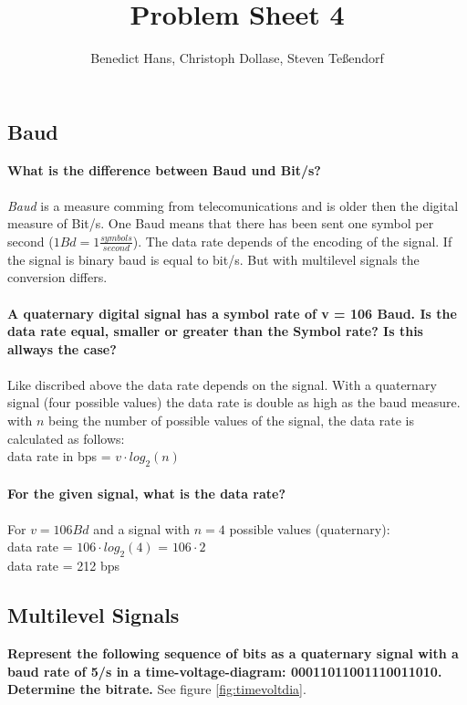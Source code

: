 \documentclass[a4paper,12pt]{article}
\author{Benedict Hans, Christoph Dollase, Steven Te\ss endorf}
\title{ \textbf{Problem Sheet 4}} %
\begin{document}
	 
	\maketitle	 %
	
\subsection{Baud}
\textbf{What is the difference between Baud und Bit/s?}\\
\\
\textit{Baud} is a measure comming from telecomunications and is older then the digital measure of Bit/s.
One Baud means that there has been sent one symbol per second ($1Bd = 1\frac{symbols}{second}$). The data rate depends of the encoding of the signal. If the signal is binary baud is equal to bit/s. But with multilevel signals the conversion differs.\\
\\
\textbf{A quaternary digital signal has a symbol rate of v = 106 Baud. Is the data rate equal,	smaller or greater than the Symbol rate? Is this allways the case?}\\
\\
Like discribed above the data rate depends on the signal. With a quaternary signal (four possible values) the data rate is double as high as the baud measure. \\
with $n$ being the number of possible values of the signal, the data rate is calculated as follows: \\
data rate in bps = $v \cdot log_{2}(n)$ \\
\\ 
\textbf{For the given signal, what is the data rate?}\\
\\
For $v = 106 Bd$ and a signal with $n=4$ possible values (quaternary):\\
data rate = $106 \cdot log_{2}(4)$ = $106 \cdot 2$ \\
data rate = 212 bps

\subsection{Multilevel Signals}
\textbf{Represent the following sequence of bits as a quaternary signal with a baud rate of 5/s in a time-voltage-diagram: 00011011001110011010. Determine the bitrate.} See figure \ref{fig:timevoltdia}.
\end{document}
